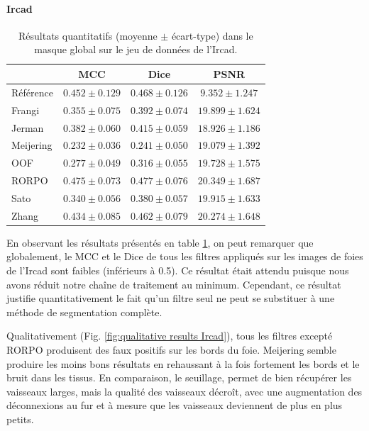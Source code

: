 \paragraph{Ircad}

\begin{table}[!ht]
  \begin{center}
      \caption{Résultats quantitatifs (moyenne $\pm$ écart-type) dans le masque global \maskglobal sur le jeu de données de l'Ircad.}
      \label{tab:quantitative results Ircad}
      \begin{tabular}{lccc}
          \hline
          & MCC & Dice & PSNR \\ 
          \hline
          Référence	& $ 0.452 \pm 0.129	$ & $ 0.468 \pm	0.126 $ & $	9.352  \pm  1.247 $ \\
          Frangi	    & $ 0.355 \pm 0.075	$ & $ 0.392 \pm	0.074 $ & $	19.899 \pm 	1.624 $ \\
          Jerman	    & $ 0.382 \pm 0.060	$ & $ 0.415 \pm	0.059 $ & $	18.926 \pm 	1.186 $ \\
          Meijering   & $ 0.232 \pm 0.036	$ & $ 0.241 \pm	0.050 $ & $	19.079 \pm 	1.392 $ \\
          OOF	        & $ 0.277 \pm 0.049	$ & $ 0.316 \pm	0.055 $ & $	19.728 \pm 	1.575 $ \\
          RORPO	    & $ 0.475 \pm 0.073	$ & $ 0.477 \pm	0.076 $ & $	20.349 \pm 	1.687 $ \\
          Sato	    & $ 0.340 \pm 0.056	$ & $ 0.380 \pm	0.057 $ & $	19.915 \pm 	1.633 $ \\
          Zhang	    & $ 0.434 \pm 0.085	$ & $ 0.462 \pm	0.079 $ & $	20.274 \pm 	1.648 $ \\
    
          \hline
      \end{tabular}  
      \end{center}    
\end{table}

En observant les résultats présentés en table \ref{tab:quantitative results Ircad}, on peut remarquer que globalement, le MCC et le Dice de tous les filtres appliqués sur les images de foies de l'Ircad sont faibles (inférieurs à 0.5). Ce résultat était attendu puisque nous avons réduit notre chaîne de traitement au minimum. Cependant, ce résultat justifie quantitativement le fait qu'un filtre seul ne peut se substituer à une méthode de segmentation complète.

Qualitativement (Fig. \ref{fig:qualitative results Ircad}), tous les filtres excepté RORPO produisent des faux positifs sur les bords du foie. Meijering semble produire les moins bons résultats en rehaussant à la fois fortement les bords et le bruit dans les tissus. En comparaison, le seuillage, permet de bien récupérer les vaisseaux larges, mais la qualité des vaisseaux décroît, avec une augmentation des déconnexions au fur et à mesure que les vaisseaux deviennent de plus en plus petits. 

